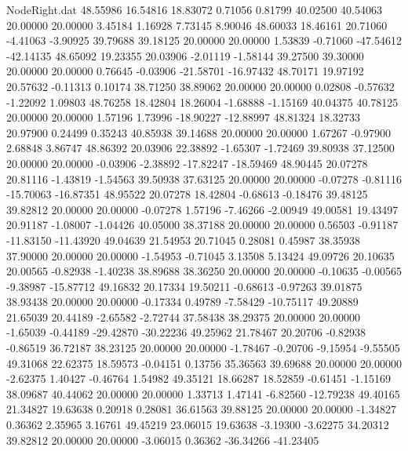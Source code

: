 \begin{filecontents}{NodeRight.dat}
  48.55986   16.54816   18.83072     0.71056    0.81799   40.02500   40.54063   20.00000   20.00000    3.45184    1.16928    7.73145    8.90046
  48.60033   18.46161   20.71060    -4.41063   -3.90925   39.79688   39.18125   20.00000   20.00000    1.53839   -0.71060  -47.54612  -42.14135
  48.65092   19.23355   20.03906    -2.01119   -1.58144   39.27500   39.30000   20.00000   20.00000    0.76645   -0.03906  -21.58701  -16.97432
  48.70171   19.97192   20.57632    -0.11313    0.10174   38.71250   38.89062   20.00000   20.00000    0.02808   -0.57632   -1.22092    1.09803
  48.76258   18.42804   18.26004    -1.68888   -1.15169   40.04375   40.78125   20.00000   20.00000    1.57196    1.73996  -18.90227  -12.88997
  48.81324   18.32733   20.97900     0.24499    0.35243   40.85938   39.14688   20.00000   20.00000    1.67267   -0.97900    2.68848    3.86747
  48.86392   20.03906   22.38892    -1.65307   -1.72469   39.80938   37.12500   20.00000   20.00000   -0.03906   -2.38892  -17.82247  -18.59469
  48.90445   20.07278   20.81116    -1.43819   -1.54563   39.50938   37.63125   20.00000   20.00000   -0.07278   -0.81116  -15.70063  -16.87351
  48.95522   20.07278   18.42804    -0.68613   -0.18476   39.48125   39.82812   20.00000   20.00000   -0.07278    1.57196   -7.46266   -2.00949
  49.00581   19.43497   20.91187    -1.08007   -1.04426   40.05000   38.37188   20.00000   20.00000    0.56503   -0.91187  -11.83150  -11.43920
  49.04639   21.54953   20.71045     0.28081    0.45987   38.35938   37.90000   20.00000   20.00000   -1.54953   -0.71045    3.13508    5.13424
  49.09726   20.10635   20.00565    -0.82938   -1.40238   38.89688   38.36250   20.00000   20.00000   -0.10635   -0.00565   -9.38987  -15.87712
  49.16832   20.17334   19.50211    -0.68613   -0.97263   39.01875   38.93438   20.00000   20.00000   -0.17334    0.49789   -7.58429  -10.75117
  49.20889   21.65039   20.44189    -2.65582   -2.72744   37.58438   38.29375   20.00000   20.00000   -1.65039   -0.44189  -29.42870  -30.22236
  49.25962   21.78467   20.20706    -0.82938   -0.86519   36.72187   38.23125   20.00000   20.00000   -1.78467   -0.20706   -9.15954   -9.55505
  49.31068   22.62375   18.59573    -0.04151    0.13756   35.36563   39.69688   20.00000   20.00000   -2.62375    1.40427   -0.46764    1.54982
  49.35121   18.66287   18.52859    -0.61451   -1.15169   38.09687   40.44062   20.00000   20.00000    1.33713    1.47141   -6.82560  -12.79238
  49.40165   21.34827   19.63638     0.20918    0.28081   36.61563   39.88125   20.00000   20.00000   -1.34827    0.36362    2.35965    3.16761
  49.45219   23.06015   19.63638    -3.19300   -3.62275   34.20312   39.82812   20.00000   20.00000   -3.06015    0.36362  -36.34266  -41.23405

\end{filecontents}
